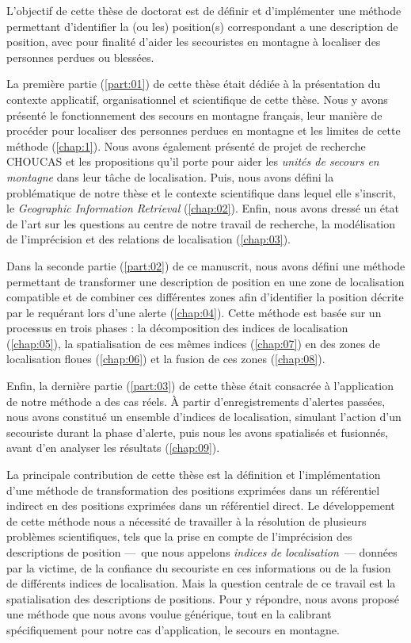 
L'objectif de cette thèse de doctorat est de définir et d'implémenter
une méthode permettant d'identifier la (ou les) position(s)
correspondant a une description de position, avec pour finalité
d'aider les secouristes en montagne à localiser des personnes perdues
ou blessées.

La première partie (\ref{part:01}) de cette thèse était dédiée à la
présentation du contexte applicatif, organisationnel et scientifique
de cette thèse. Nous y avons présenté le fonctionnement des secours en
montagne français, leur manière de procéder pour localiser des
personnes perdues en montagne et les limites de cette méthode
(\autoref{chap:1}). Nous avons également présenté de projet de
recherche CHOUCAS et les propositions qu'il porte pour aider les
\emph{unités de secours en montagne} dans leur tâche de
localisation. Puis, nous avons défini la problématique de notre thèse
et le contexte scientifique dans lequel elle s'inscrit, le
\emph{Geographic Information Retrieval} (\autoref{chap:02}). Enfin,
nous avons dressé un état de l'art sur les questions au centre de
notre travail de recherche, la modélisation de l'imprécision et des
relations de localisation (\autoref{chap:03}).

Dans la seconde partie (\ref{part:02}) de ce manuscrit, nous avons
défini une méthode permettant de transformer une description de
position en une zone de localisation compatible et de combiner ces
différentes zones afin d’identifier la position décrite par le
requérant lors d'une alerte (\autoref{chap:04}). Cette méthode est
basée sur un processus en trois phases : la décomposition des indices
de localisation (\autoref{chap:05}), la spatialisation de ces mêmes
indices (\autoref{chap:07}) en des zones de localisation floues
(\autoref{chap:06}) et la fusion de ces zones (\autoref{chap:08}).

Enfin, la dernière partie (\ref{part:03}) de cette thèse était
consacrée à l’application de notre méthode a des cas réels. À partir
d'enregistrements d'alertes passées, nous avons constitué un ensemble
d'indices de localisation, simulant l'action d'un secouriste durant la
phase d'alerte, puis nous les avons spatialisés et fusionnés, avant
d'en analyser les résultats (\autoref{chap:09}).


La principale contribution de cette thèse est la définition et
l'implémentation d'une méthode de transformation des positions
exprimées dans un référentiel indirect en des positions exprimées dans
un référentiel direct. Le développement de cette méthode nous a
nécessité de travailler à la résolution de plusieurs problèmes
scientifiques, tels que la prise en compte de l'imprécision des
descriptions de position ---~que nous appelons \emph{indices de
  localisation}~--- données par la victime, de la confiance du
secouriste en ces informations ou de la fusion de différents indices
de localisation. Mais la question centrale de ce travail est la
spatialisation des descriptions de positions. Pour y répondre, nous
avons proposé une méthode que nous avons voulue générique, tout en la
calibrant spécifiquement pour notre cas d’application, le secours en
montagne.

